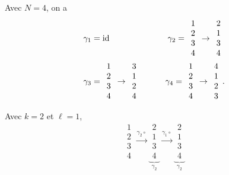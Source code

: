 Avec $N=4$, on a
\begin{align*}
	&\gamma_1= \operatorname{id}\qquad
	&\gamma_2 = \begin{array}{c}
		1\\2\\3\\4
	\end{array} \to \begin{array}{c}
		2\\1\\3\\4
	\end{array}\\
	&\gamma_3 = \begin{array}{c}
		1\\2\\3\\4
	\end{array} \to \begin{array}{c}
		3\\1\\2\\4
	\end{array} \qquad
	&\gamma_4 = \begin{array}{c}
		1\\2\\3\\4
	\end{array} \to \begin{array}{c}
		4\\1\\2\\3
	\end{array}.
\end{align*}

Avec $k = 2$ et $\ell = 1$,
\[
	\begin{array}{c}
		1\\2\\3\\4
	\end{array} \xrightarrow{\gamma_2 \circ} \underbrace{\begin{array}{c}
		2\\1\\3\\4
	\end{array}}_{\gamma_2} \xrightarrow{\gamma_1 \circ} \underbrace{\begin{array}{c}
		2\\1\\3\\4
	\end{array}}_{\gamma_2}
\]

